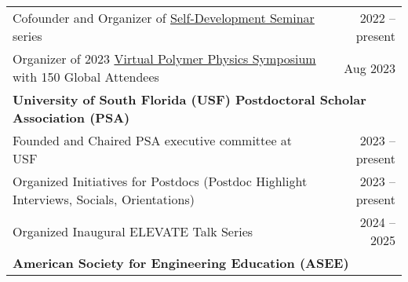 \documentclass[letterpaper,11pt]{article}
\begin{document}
\begin{longtable}{@{}p{}r@{}}
  \hspace{3mm} \small Cofounder and Organizer of \href{https://sites.google.com/view/polymerphysics/self-dev-seminars}{Self-Development Seminar} series                                                                  & 2022 -- present                                                             \\
  \hspace{3mm} \small Organizer of 2023 \href{https://sites.google.com/view/polymerphysics/vpps-2023-schedule}{Virtual Polymer Physics Symposium} with 150 Global Attendees                                              & Aug 2023                                                                    \\ [4pt]
  \multicolumn{2}{l}{\hspace{-3mm} \bf{University of South Florida (USF) Postdoctoral Scholar Association (PSA)}}                                                                                                                                                                                      \\
  \hspace{3mm} \small Founded and Chaired PSA executive committee at USF                                                                                                                                                 & 2023 -- present                                                             \\
  \hspace{3mm} \small Organized Initiatives for Postdocs (Postdoc Highlight Interviews, Socials, Orientations)                                                                                                           & 2023 -- present                                                             \\
  \hspace{3mm} \small Organized Inaugural ELEVATE Talk Series                                                                                                                                                            & 2024 -- 2025                                                                \\ [4pt]
  \multicolumn{2}{l}{\hspace{-3mm} \bf{American Society for Engineering Education (ASEE)}}                                                                                                                                                                                                             \\

\end{longtable}
\end{document}
